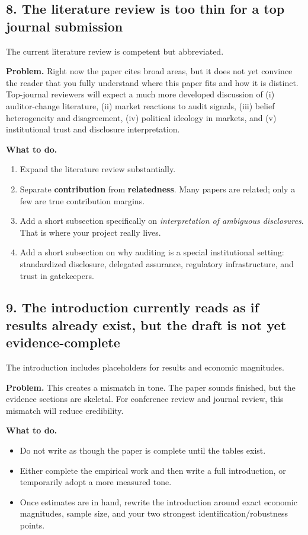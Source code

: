 \documentclass[12pt]{article}
\begin{document}
\subsection{8. The literature review is too thin for a top journal submission}
The current literature review is competent but abbreviated.

\textbf{Problem.} Right now the paper cites broad areas, but it does not yet convince the reader that you fully understand where this paper fits and how it is distinct. Top-journal reviewers will expect a much more developed discussion of (i) auditor-change literature, (ii) market reactions to audit signals, (iii) belief heterogeneity and disagreement, (iv) political ideology in markets, and (v) institutional trust and disclosure interpretation.

\textbf{What to do.}
\begin{enumerate}[leftmargin=2em]
    \item Expand the literature review substantially.
    \item Separate \textbf{contribution} from \textbf{relatedness}. Many papers are related; only a few are true contribution margins.
    \item Add a short subsection specifically on \emph{interpretation of ambiguous disclosures}. That is where your project really lives.
    \item Add a short subsection on why auditing is a special institutional setting: standardized disclosure, delegated assurance, regulatory infrastructure, and trust in gatekeepers.
\end{enumerate}

\subsection{9. The introduction currently reads as if results already exist, but the draft is not yet evidence-complete}
The introduction includes placeholders for results and economic magnitudes.

\textbf{Problem.} This creates a mismatch in tone. The paper sounds finished, but the evidence sections are skeletal. For conference review and journal review, this mismatch will reduce credibility.

\textbf{What to do.}
\begin{itemize}[leftmargin=2em]
    \item Do not write as though the paper is complete until the tables exist.
    \item Either complete the empirical work and then write a full introduction, or temporarily adopt a more measured tone.
    \item Once estimates are in hand, rewrite the introduction around exact economic magnitudes, sample size, and your two strongest identification/robustness points.
\end{itemize}
\end{document}
